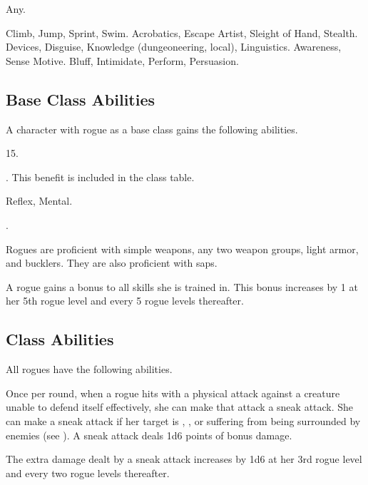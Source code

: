      Any.

     Climb, Jump, Sprint, Swim.
     Acrobatics, Escape Artist, Sleight of Hand, Stealth.
     Devices, Disguise, Knowledge (dungeoneering, local), Linguistics.
     Awareness, Sense Motive.
     Bluff, Intimidate, Perform, Persuasion.

    \subsection{Base Class Abilities}
        A character with rogue as a base class gains the following abilities.

         15.

         . This benefit is included in the class table.

          Reflex,  Mental.

         .

        Rogues are proficient with simple weapons, any two weapon groups, light armor, and bucklers.
        They are also proficient with saps.

        A rogue gains a  bonus to all skills she is trained in.
        This bonus increases by 1 at her 5th rogue level and every 5 rogue levels thereafter.

    \subsection{Class Abilities}
        All rogues have the following abilities.

        Once per round, when a rogue hits with a physical attack against a creature unable to defend itself effectively, she can make that attack a sneak attack.
        She can make a sneak attack if her target is \unaware, , or suffering  from being surrounded by enemies (see ).
        A sneak attack deals 1d6 points of bonus damage.

        The extra damage dealt by a sneak attack increases by 1d6 at her 3rd rogue level and every two rogue levels thereafter.

